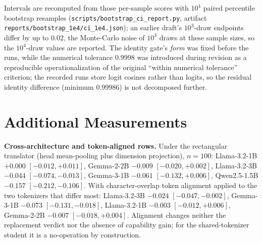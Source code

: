\documentclass{article} %
\begin{document}
Intervals are recomputed from those per-sample scores with $10^4$ paired
percentile bootstrap resamples (\texttt{scripts/bootstrap\_ci\_report.py},
artifact \texttt{reports/bootstrap\_1e4/ci\_1e4.json}); an earlier draft's
$10^3$-draw endpoints differ by up to $0.02$, the Monte-Carlo noise of $10^3$
draws at these sample sizes, so the $10^4$-draw values are reported.
The identity gate's \emph{form} was fixed before the runs, while the numerical
tolerance $0.9998$ was introduced during revision as a reproducible
operationalization of the original ``within numerical tolerance'' criterion;
the recorded runs store logit cosines rather than logits, so the residual
identity difference (minimum $0.99986$) is not decomposed further.

\begin{table}[t]
\centering
\caption{Gradient-trained families: interval detail for the rows
Table~\ref{tab:main} reports as training ranges ($10^4$-draw paired
bootstrap). Every recorded training of every family has an interval upper
bound below zero, which is what its \emph{degraded} direction label requires.}
\label{tab:mlp-ci}
\end{table}

\section{Additional Measurements}
\label{app:extra}

\textbf{Cross-architecture and token-aligned rows.} Under the rectangular translator
(head mean-pooling plus dimension projection), $n{=}100$: Llama-3.2-1B $+0.000$
$[-0.012,+0.011]$, Gemma-2-2B $-0.009$ $[-0.020,+0.002]$, Llama-3.2-3B $-0.044$
$[-0.074,-0.013]$, Gemma-3-1B $-0.061$ $[-0.132,+0.006]$, Qwen2.5-1.5B
$-0.157$ $[-0.212,-0.106]$. With character-overlap token alignment applied to
the two tokenizers that differ most: Llama-3.2-3B $-0.024$ $[-0.047,-0.002]$,
Gemma-3-1B $-0.073$ $[-0.131,-0.018]$, Llama-3.2-1B $-0.003$
$[-0.012,+0.006]$, Gemma-2-2B $-0.007$ $[-0.018,+0.004]$. Alignment changes
neither the replacement verdict nor the absence of capability gain; for the
shared-tokenizer student it is a no-operation by construction.
\end{document}
